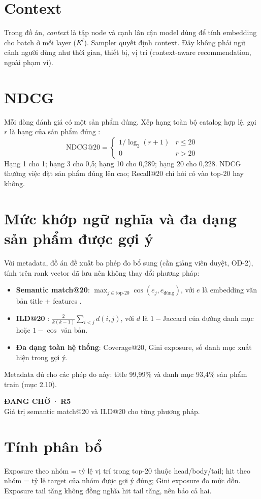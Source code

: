 \documentclass[11pt,a4paper,oneside]{report}
\newcommand{\pending}[2]{\begin{tcolorbox}[colback=amberpale,colframe=amber,boxrule=0.8pt,arc=2pt,left=6pt,right=6pt,top=4pt,bottom=4pt,fontupper=\small]\textbf{\color{coral}ĐANG CHỜ} · \textbf{#1}\\ #2\end{tcolorbox}}
\begin{document}
\section{Context}
Trong đồ án, \emph{context} là tập node và cạnh lân cận model dùng để tính embedding cho batch ở mỗi layer ($K^l$). Sampler quyết định context. Đây không phải ngữ cảnh người dùng như thời gian, thiết bị, vị trí (context-aware recommendation, ngoài phạm vi).

\section{NDCG}
Mỗi dòng đánh giá có một sản phẩm đúng. Xếp hạng toàn bộ catalog hợp lệ, gọi $r$ là hạng của sản phẩm đúng \cite{ndcg}:
\[
\mathrm{NDCG@20} = \begin{cases} 1/\log_2(r+1) & r \le 20 \\ 0 & r > 20 \end{cases}
\]
Hạng 1 cho 1; hạng 3 cho 0,5; hạng 10 cho 0,289; hạng 20 cho 0,228. NDCG thưởng việc đặt sản phẩm đúng lên cao; Recall@20 chỉ hỏi có vào top-20 hay không.

\section{Mức khớp ngữ nghĩa và đa dạng sản phẩm được gợi ý}\label{sec:semantic}
Với metadata, đồ án đề xuất ba phép đo bổ sung (cần giảng viên duyệt, OD-2), tính trên rank vector đã lưu nên không thay đổi phương pháp:
\begin{itemize}
\item \textbf{Semantic match@20}: $\max_{j\in\text{top-20}} \cos(e_j, e_{\text{đúng}})$, với $e$ là embedding văn bản title + features \cite{sbert}.
\item \textbf{ILD@20} \cite{ziegler}: $\frac{2}{k(k-1)}\sum_{i<j} d(i,j)$, với $d$ là $1-$Jaccard của đường danh mục hoặc $1-\cos$ văn bản.
\item \textbf{Đa dạng toàn hệ thống}: Coverage@20, Gini exposure, số danh mục xuất hiện trong gợi ý.
\end{itemize}

Metadata đủ cho các phép đo này: title 99,99\% và danh mục 93,4\% sản phẩm train (mục 2.10).

\pending{R5}{Giá trị semantic match@20 và ILD@20 cho từng phương pháp.}

\section{Tính phân bổ}
Exposure theo nhóm = tỷ lệ vị trí trong top-20 thuộc head/body/tail; hit theo nhóm = tỷ lệ target của nhóm được gợi ý đúng; Gini exposure đo mức dồn. Exposure tail tăng không đồng nghĩa hit tail tăng, nên báo cả hai.
\end{document}
